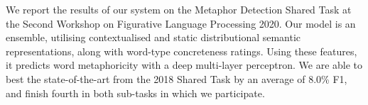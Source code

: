 We report the results of our system on the Metaphor Detection Shared Task at the Second Workshop on Figurative Language Processing 2020. Our model is an ensemble, utilising contextualised and static distributional semantic representations, along with word-type concreteness ratings. Using these features, it predicts word metaphoricity with a deep multi-layer perceptron. We are able to best the state-of-the-art from the 2018 Shared Task by an average of 8.0\% F1, and finish fourth in both sub-tasks in which we participate.
